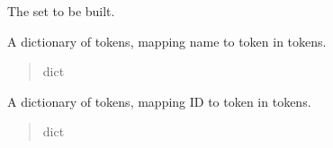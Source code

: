 \documentclass[letterpaper,10pt,english]{sphinxmanual}
\begin{document}
\begin{fulllineitems}
\begin{fulllineitems}
\end{fulllineitems}


\begin{fulllineitems}
\label{\detokenize{nodes:nodes.nodeBuilder.Build_set.set}}
\pysigstartsignatures
\pysigline
{}
\pysigstopsignatures
\sphinxAtStartPar
The set to be built.
\begin{quote}\begin{description}
\sphinxAtStartPar
{\hyperref[\detokenize{nodes:nodes.nodeEnums.Set}]{}}

\end{description}\end{quote}

\end{fulllineitems}


\begin{fulllineitems}
\label{\detokenize{nodes:nodes.nodeBuilder.Build_set.name_dict}}
\pysigstartsignatures
\pysigline
{}
\pysigstopsignatures
\sphinxAtStartPar
A dictionary of tokens, mapping name to token in tokens.
\begin{quote}\begin{description}
\sphinxAtStartPar
dict

\end{description}\end{quote}

\end{fulllineitems}


\begin{fulllineitems}
\label{\detokenize{nodes:nodes.nodeBuilder.Build_set.id_dict}}
\pysigstartsignatures
\pysigline
{}
\pysigstopsignatures
\sphinxAtStartPar
A dictionary of tokens, mapping ID to token in tokens.
\begin{quote}\begin{description}
\sphinxAtStartPar
dict


\end{description}
\end{quote}
\end{fulllineitems}
\end{fulllineitems}
\end{document}
